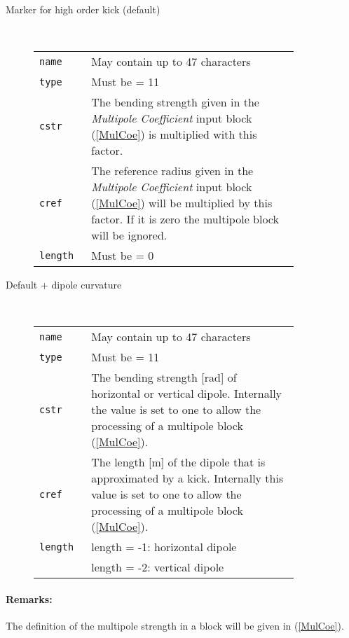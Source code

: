 \begin{description}
    \item [Marker for high order kick (default)]~\\
    
    \bigskip
    \begin{tabular}{@{}lp{0.8\linewidth}}
        \texttt{name} & May contain up to 47 characters \\
        \texttt{type} & Must be = 11 \\
        \texttt{cstr} & The bending strength given in the \textit{Multipole Coefficient} input block (\ref{MulCoe}) is multiplied with this factor.\\
        \texttt{cref} & The reference radius given in the \textit{Multipole Coefficient} input block (\ref{MulCoe}) will be multiplied by this factor. If it is zero the multipole block will be ignored.\\
        \texttt{length} & Must be = 0
    \end{tabular}
    \item [Default + dipole curvature]~\\
    
    \bigskip
    \begin{tabular}{@{}lp{0.8\linewidth}}
        \texttt{name} & May contain up to 47 characters \\
        \texttt{type} & Must be = 11 \\
        \texttt{cstr} & The bending strength [rad] of horizontal or vertical dipole. Internally the value is set to one to allow the processing of a multipole block (\ref{MulCoe}).\\
        \texttt{cref} & The length [m] of the dipole that is approximated by a kick. Internally this value is set to one to allow the processing of a multipole block (\ref{MulCoe}). \\
        \texttt{length} & length = -1: horizontal dipole \\
                        & length = -2: vertical dipole
    \end{tabular}
\end{description}

\paragraph{Remarks:}
The definition of the multipole strength in a block will be given in (\ref{MulCoe}).

